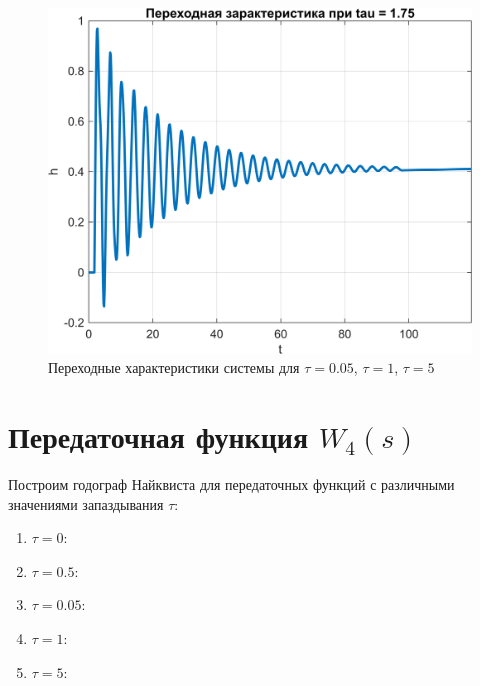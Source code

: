 \begin{figure}[H]
\begin{minipage}{0.45\textwidth}
    \end{minipage}
    \vfill
    \begin{minipage}{0.45\textwidth}
        \centering
        \includegraphics[width=\textwidth, trim={0cm 0cm 0cm 0cm}]{../images/3_1_7_cl.png}
    \end{minipage}
    \hfill
    \begin{minipage}{0.45\textwidth}
        \centering
    \end{minipage}
    \caption{Переходные характеристики системы для $\tau = 0.05$, $\tau = 1$, $\tau = 5$}
\end{figure}

\section{Передаточная функция $W_4(s)$}

Построим годограф Найквиста для передаточных функций с различными значениями запаздывания $\tau$:
\begin{enumerate}
    \item $\tau = 0$:
    \item $\tau = 0.5$:
    \item $\tau = 0.05$:
    \item $\tau = 1$:
    \item $\tau = 5$:
\end{enumerate}

